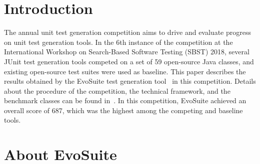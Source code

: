 \documentclass[sigconf,table]{acmart}
\newcommand{\TODO}[1]{\textbf{\textcolor{ScarletRed}{[TODO: #1]}}\xspace}
\newcommand{\TODO}[1]{}
\newcommand{\EVOSUITE}{{\sc EvoSuite}\xspace}
\newcommand{\JTEXPERT}{{\sc jTExpert}\xspace}
\newcommand{\RANDOOP}{{\sc Randoop}\xspace}
\newcommand{\TT}{{\sc T3}\xspace}
\newcommand{\TOTALPOINTS}{{687}\xspace}
\begin{document}
\section{Introduction}
The annual unit test generation competition aims to drive and evaluate
progress on unit test generation tools. In the 6th instance of the
competition at the International Workshop on Search-Based Software
Testing (SBST) 2018, several JUnit test generation tools
competed on a set of 59 open-source Java classes, and 
existing open-source test suites were used as
baseline. This paper describes the results obtained by the \EVOSUITE
test generation tool~\cite{FrA11c} in this competition. Details about
the procedure of the competition, the technical framework, and the
benchmark classes can be found in~\cite{sbst18competition}.  In this
competition, \EVOSUITE achieved an overall score of \TOTALPOINTS,
which was the highest among the competing and baseline
tools.

\section{About EvoSuite}
\end{document}
